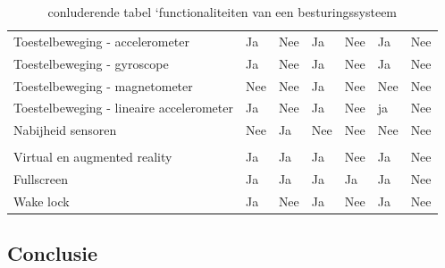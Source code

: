 \begin{table}[]
\begin{tabular}{p{6cm}p{13mm}p{13mm}p{13mm}p{13mm}p{13mm}p{13mm}}
				   Toestelbeweging - accelerometer & \cellcolor{green!40} Ja  & \cellcolor{red!50} Nee & \cellcolor{green!40} Ja  & \cellcolor{red!50} Nee& \cellcolor{green!40} Ja & \cellcolor{red!50} Nee \\
				   
				   Toestelbeweging - gyroscope & \cellcolor{green!40} Ja  & \cellcolor{red!50} Nee & \cellcolor{green!40} Ja  & \cellcolor{red!50} Nee& \cellcolor{green!40} Ja & \cellcolor{red!50} Nee \\
				   
				    Toestelbeweging - magnetometer & \cellcolor{red!50} Nee  & \cellcolor{red!50} Nee & \cellcolor{green!40} Ja  & \cellcolor{red!50} Nee& \cellcolor{red!50} Nee & \cellcolor{red!50} Nee \\
				   
				   Toestelbeweging - lineaire accelerometer  & \cellcolor{green!40} Ja  & \cellcolor{red!50} Nee & \cellcolor{green!40} Ja  & \cellcolor{red!50} Nee& \cellcolor{green!40} ja  & \cellcolor{red!50} Nee \\
				   
				   Nabijheid sensoren &  \cellcolor{red!50} Nee  &  \cellcolor{green!40} Ja  &  \cellcolor{red!50} Nee  & \cellcolor{red!50} Nee &  \cellcolor{red!50} Nee &  \cellcolor{red!50} Nee \\
				   
				   &  & &  &  &  &  \\
				   
				    Virtual en augmented reality  & \cellcolor{green!40} Ja  & \cellcolor{green!40} Ja & \cellcolor{green!40} Ja & \cellcolor{red!50} Nee  & \cellcolor{green!40} Ja & \cellcolor{red!50} Nee \\
				    
				     Fullscreen & \cellcolor{green!40} Ja  & \cellcolor{green!40} Ja & \cellcolor{green!40} Ja & \cellcolor{green!40} Ja   & \cellcolor{green!40} Ja & \cellcolor{red!50} Nee \\
				   
				   Wake lock & \cellcolor{green!40} Ja  &  \cellcolor{red!50} Nee & \cellcolor{green!40} Ja  & \cellcolor{red!50} Nee & \cellcolor{green!40} Ja &  \cellcolor{red!50} Nee \\
	
			\end{tabular}	
			\caption{conluderende tabel ‘functionaliteiten van een besturingssysteem}
		\end{table}
	
	\clearpage
	\subsection{Conclusie}
	
